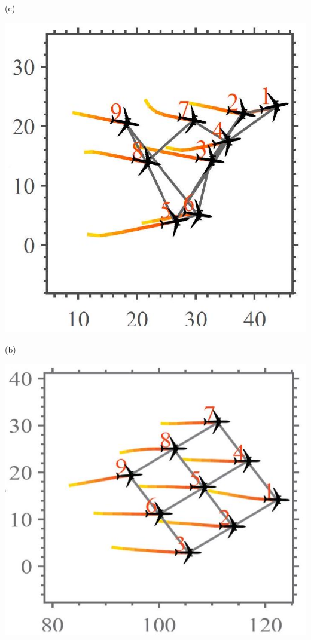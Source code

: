 \documentclass[10pt]{article}
\begin{document}
(c)

\begin{center}
\includegraphics[max width=\textwidth]{2023_10_07_53b70c7408bc8e139415g-37(2)}
\end{center}

(b)

\begin{center}
\includegraphics[max width=\textwidth]{2023_10_07_53b70c7408bc8e139415g-37(3)}
\end{center}
\end{document}
